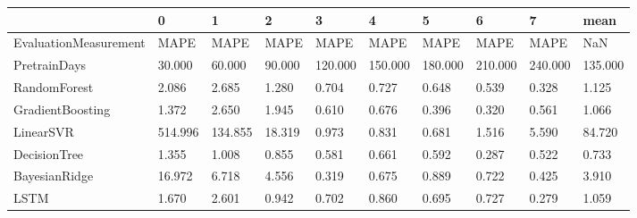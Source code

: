 \begin{tabular}{llllllllll}
\toprule
{} &       0 &       1 &      2 &       3 &       4 &       5 &       6 &       7 &    mean \\
\midrule
EvaluationMeasurement &    MAPE &    MAPE &   MAPE &    MAPE &    MAPE &    MAPE &    MAPE &    MAPE &     NaN \\
PretrainDays          &  30.000 &  60.000 & 90.000 & 120.000 & 150.000 & 180.000 & 210.000 & 240.000 & 135.000 \\
RandomForest          &   2.086 &   2.685 &  1.280 &   0.704 &   0.727 &   0.648 &   0.539 &   0.328 &   1.125 \\
GradientBoosting      &   1.372 &   2.650 &  1.945 &   0.610 &   0.676 &   0.396 &   0.320 &   0.561 &   1.066 \\
LinearSVR             & 514.996 & 134.855 & 18.319 &   0.973 &   0.831 &   0.681 &   1.516 &   5.590 &  84.720 \\
DecisionTree          &   1.355 &   1.008 &  0.855 &   0.581 &   0.661 &   0.592 &   0.287 &   0.522 &   0.733 \\
BayesianRidge         &  16.972 &   6.718 &  4.556 &   0.319 &   0.675 &   0.889 &   0.722 &   0.425 &   3.910 \\
LSTM                  &   1.670 &   2.601 &  0.942 &   0.702 &   0.860 &   0.695 &   0.727 &   0.279 &   1.059 \\
\bottomrule
\end{tabular}
